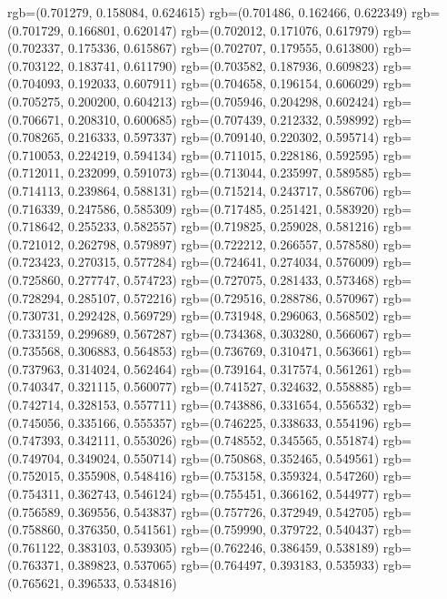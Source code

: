 {{{					rgb=(0.701279, 0.158084, 0.624615)
					rgb=(0.701486, 0.162466, 0.622349)
					rgb=(0.701729, 0.166801, 0.620147)
					rgb=(0.702012, 0.171076, 0.617979)
					rgb=(0.702337, 0.175336, 0.615867)
					rgb=(0.702707, 0.179555, 0.613800)
					rgb=(0.703122, 0.183741, 0.611790)
					rgb=(0.703582, 0.187936, 0.609823)
					rgb=(0.704093, 0.192033, 0.607911)
					rgb=(0.704658, 0.196154, 0.606029)
					rgb=(0.705275, 0.200200, 0.604213)
					rgb=(0.705946, 0.204298, 0.602424)
					rgb=(0.706671, 0.208310, 0.600685)
					rgb=(0.707439, 0.212332, 0.598992)
					rgb=(0.708265, 0.216333, 0.597337)
					rgb=(0.709140, 0.220302, 0.595714)
					rgb=(0.710053, 0.224219, 0.594134)
					rgb=(0.711015, 0.228186, 0.592595)
					rgb=(0.712011, 0.232099, 0.591073)
					rgb=(0.713044, 0.235997, 0.589585)
					rgb=(0.714113, 0.239864, 0.588131)
					rgb=(0.715214, 0.243717, 0.586706)
					rgb=(0.716339, 0.247586, 0.585309)
					rgb=(0.717485, 0.251421, 0.583920)
					rgb=(0.718642, 0.255233, 0.582557)
					rgb=(0.719825, 0.259028, 0.581216)
					rgb=(0.721012, 0.262798, 0.579897)
					rgb=(0.722212, 0.266557, 0.578580)
					rgb=(0.723423, 0.270315, 0.577284)
					rgb=(0.724641, 0.274034, 0.576009)
					rgb=(0.725860, 0.277747, 0.574723)
					rgb=(0.727075, 0.281433, 0.573468)
					rgb=(0.728294, 0.285107, 0.572216)
					rgb=(0.729516, 0.288786, 0.570967)
					rgb=(0.730731, 0.292428, 0.569729)
					rgb=(0.731948, 0.296063, 0.568502)
					rgb=(0.733159, 0.299689, 0.567287)
					rgb=(0.734368, 0.303280, 0.566067)
					rgb=(0.735568, 0.306883, 0.564853)
					rgb=(0.736769, 0.310471, 0.563661)
					rgb=(0.737963, 0.314024, 0.562464)
					rgb=(0.739164, 0.317574, 0.561261)
					rgb=(0.740347, 0.321115, 0.560077)
					rgb=(0.741527, 0.324632, 0.558885)
					rgb=(0.742714, 0.328153, 0.557711)
					rgb=(0.743886, 0.331654, 0.556532)
					rgb=(0.745056, 0.335166, 0.555357)
					rgb=(0.746225, 0.338633, 0.554196)
					rgb=(0.747393, 0.342111, 0.553026)
					rgb=(0.748552, 0.345565, 0.551874)
					rgb=(0.749704, 0.349024, 0.550714)
					rgb=(0.750868, 0.352465, 0.549561)
					rgb=(0.752015, 0.355908, 0.548416)
					rgb=(0.753158, 0.359324, 0.547260)
					rgb=(0.754311, 0.362743, 0.546124)
					rgb=(0.755451, 0.366162, 0.544977)
					rgb=(0.756589, 0.369556, 0.543837)
					rgb=(0.757726, 0.372949, 0.542705)
					rgb=(0.758860, 0.376350, 0.541561)
					rgb=(0.759990, 0.379722, 0.540437)
					rgb=(0.761122, 0.383103, 0.539305)
					rgb=(0.762246, 0.386459, 0.538189)
					rgb=(0.763371, 0.389823, 0.537065)
					rgb=(0.764497, 0.393183, 0.535933)
					rgb=(0.765621, 0.396533, 0.534816)
}}}
